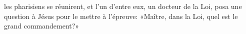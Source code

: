 \encetemps les pharisiens se réunirent,
	et l’un d’entre eux, un docteur de la Loi,
	posa une question à Jésus pour le mettre à l’épreuve:
	«Maître, dans la Loi, quel est le grand commandement?»
